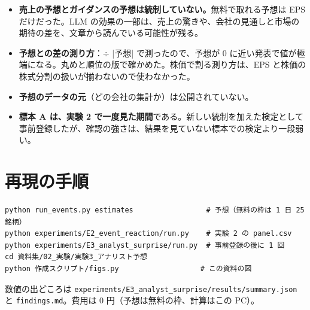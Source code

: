 \documentclass[xelatex,ja=standard,jafont=haranoaji,a4paper,10pt,openany]{bxjsreport}
\newcommand{\code}[1]{\texttt{#1}}
\begin{document}
\begin{itemize}
\item \textbf{売上の予想とガイダンスの予想は統制していない。}無料で取れる予想は EPS だけだった。LLM の効果の一部は、売上の驚きや、会社の見通しと市場の期待の差を、文章から読んでいる可能性が残る。
\item \textbf{予想との差の測り方}：$\div$ |予想| で測ったので、予想が 0 に近い発表で値が極端になる。丸めと順位の版で確かめた。株価で割る測り方は、EPS と株価の株式分割の扱いが揃わないので使わなかった。
\item \textbf{予想のデータの元}（どの会社の集計か）は公開されていない。
\item \textbf{標本 A は、実験 2 で一度見た期間}である。新しい統制を加えた検定として事前登録したが、確認の強さは、結果を見ていない標本での検定より一段弱い。
\end{itemize}

\chapter*{再現の手順}

\begin{verbatim}
python run_events.py estimates                 # 予想（無料の枠は 1 日 25 銘柄）
python experiments/E2_event_reaction/run.py    # 実験 2 の panel.csv
python experiments/E3_analyst_surprise/run.py  # 事前登録の後に 1 回
cd 資料集/02_実験/実験3_アナリスト予想
python 作成スクリプト/figs.py                   # この資料の図
\end{verbatim}

数値の出どころは \code{experiments/E3\_analyst\_surprise/results/summary.json} と \code{findings.md}。費用は 0 円（予想は無料の枠、計算はこの PC）。
\end{document}
